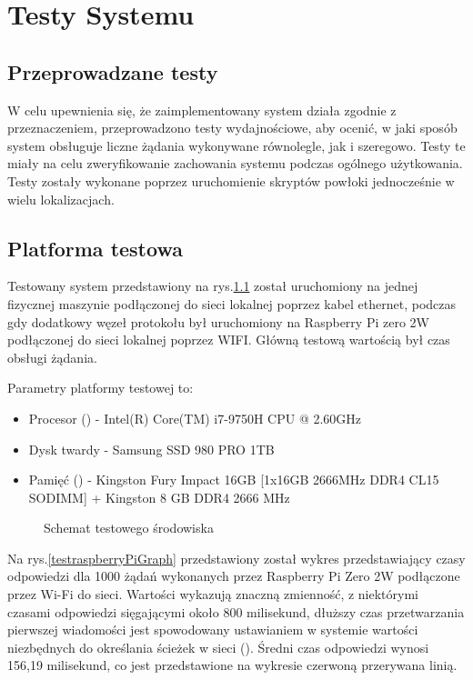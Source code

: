 \chapter{Testy Systemu}

\section{Przeprowadzane testy}

W celu upewnienia się, że zaimplementowany system działa zgodnie z przeznaczeniem, przeprowadzono testy wydajnościowe, aby ocenić, w jaki sposób system obsługuje liczne żądania wykonywane równolegle, jak i szeregowo. Testy te miały na celu zweryfikowanie zachowania systemu podczas ogólnego użytkowania. Testy zostały wykonane poprzez uruchomienie skryptów powłoki jednocześnie w wielu lokalizacjach.

\section{Platforma testowa}

Testowany system przedstawiony na rys.\ref{testowySystemSchemat} został uruchomiony na jednej fizycznej maszynie podłączonej do sieci lokalnej poprzez kabel ethernet, podczas gdy dodatkowy węzeł protokołu był uruchomiony na Raspberry Pi zero 2W podłączonej do sieci lokalnej poprzez WIFI. Główną testową wartością był czas obsługi żądania.

Parametry platformy testowej to:

\begin{itemize}
    \item Procesor  () - Intel(R) Core(TM) i7-9750H CPU @ 2.60GHz
    \item Dysk twardy - Samsung SSD 980 PRO 1TB
    \item Pamięć  () - Kingston Fury Impact 16GB [1x16GB 2666MHz DDR4 CL15 SODIMM] + Kingston 8 GB DDR4 2666 MHz
\end{itemize}


\begin{figure}[!h]
    \centering
    
    \caption{Schemat testowego środowiska}
    \label{testowySystemSchemat}
\end{figure}

\newpage Na rys.\ref{testraspberryPiGraph} przedstawiony został wykres przedstawiający czasy odpowiedzi dla 1000 żądań wykonanych przez Raspberry Pi Zero 2W podłączone przez Wi-Fi do sieci. Wartości wykazują znaczną zmienność, z niektórymi czasami odpowiedzi sięgającymi około 800 milisekund, dłuższy czas przetwarzania pierwszej wiadomości jest spowodowany ustawianiem w systemie wartości niezbędnych do określania ścieżek w sieci  (). Średni czas odpowiedzi wynosi 156,19 milisekund, co jest przedstawione na wykresie czerwoną przerywana linią.

